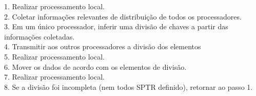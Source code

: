 1. Realizar processamento local. 
\\2. Coletar informações relevantes de distribuição de todos os processadores. 
\\3. Em um único processador, inferir uma divisão de chaves a partir das informações coletadas. 
\\4. Transmitir aos outros processadores a divisão dos elementos
\\5. Realizar processamento local. 
\\6. Mover os dados de acordo com os elementos de divisão. 
\\7. Realizar processamento local. 
\\8. Se a divisão foi incompleta (nem todos SPTR definido), retornar ao passo 1.





